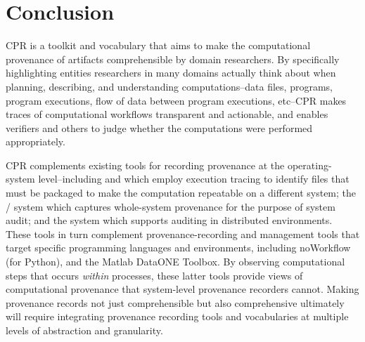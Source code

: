 \section{Conclusion}

CPR is a toolkit and vocabulary that aims to make the computational provenance of artifacts comprehensible by domain researchers. By specifically highlighting entities researchers in many domains actually think about when planning, describing, and understanding computations--data files, programs, program executions, flow of data between program executions, etc--CPR makes traces of computational workflows transparent and actionable, and enables verifiers and others to judge whether the computations were performed appropriately.

CPR complements existing tools for recording provenance at the operating-system level--including  and \cite{that_sciunits_2017} which employ execution tracing to identify files that must be packaged to make the computation repeatable on a different system; the / system which captures whole-system provenance for the purpose of system audit; and the  system which supports auditing in distributed environments. These tools in turn complement provenance-recording and management tools that target specific programming languages and environments, including noWorkflow (for Python), and the Matlab DataONE Toolbox. By observing computational steps that occurs \emph{within} processes, these latter tools provide views of computational provenance that system-level provenance recorders cannot.  Making provenance records not just comprehensible but also comprehensive ultimately will require integrating provenance recording tools and vocabularies at multiple levels of abstraction and granularity.